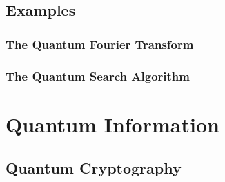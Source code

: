 \documentclass{article}
\begin{document}
    \subsection{Examples}

        \subsubsection{The Quantum Fourier Transform}

        \subsubsection{The Quantum Search Algorithm}

\section{Quantum Information}

    \subsection{Quantum Cryptography}

\newpage
\nocite{*}
\printbibliography
\end{document}
